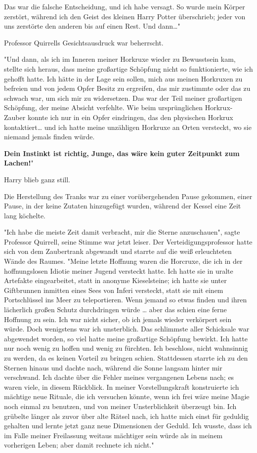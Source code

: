 {Das war die falsche Entscheidung, und ich habe versagt. So wurde mein Körper zerstört, während ich den Geist des kleinen Harry Potter überschrieb; jeder von uns zerstörte den anderen bis auf einen Rest. Und dann…"

Professor Quirrells Gesichtsausdruck war beherrscht.

"Und dann, als ich im Inneren meiner Horkruxe wieder zu Bewusstsein kam, stellte sich heraus, dass meine großartige Schöpfung nicht so funktionierte, wie ich gehofft hatte. Ich hätte in der Lage sein sollen, mich aus meinen Horkruxen zu befreien und von jedem Opfer Besitz zu ergreifen, das mir zustimmte oder das zu schwach war, um sich mir zu widersetzen. Das war der Teil meiner großartigen Schöpfung, der meine Absicht verfehlte. Wie beim ursprünglichen Horkrux-Zauber konnte ich nur in ein Opfer eindringen, das den physischen Horkrux kontaktiert… und ich hatte meine unzähligen Horkruxe an Orten versteckt, wo sie niemand jemals finden würde.

\textbf{Dein Instinkt ist richtig, Junge, das wäre kein guter Zeitpunkt zum Lachen!}"

Harry blieb ganz still.

Die Herstellung des Tranks war zu einer vorübergehenden Pause gekommen, einer Pause, in der keine Zutaten hinzugefügt wurden, während der Kessel eine Zeit lang köchelte.

"Ich habe die meiste Zeit damit verbracht, mir die Sterne anzuschauen", sagte Professor Quirrell, seine Stimme war jetzt leiser. Der Verteidigungsprofessor hatte sich von dem Zaubertrank abgewandt und starrte auf die weiß erleuchteten Wände des Raumes. "Meine letzte Hoffnung waren die Horcruxe, die ich in der hoffnungslosen Idiotie meiner Jugend versteckt hatte. Ich hatte sie in uralte Artefakte eingearbeitet, statt in anonyme Kieselsteine; ich hatte sie unter Giftbrunnen inmitten eines Sees von Inferi versteckt, statt sie mit einem Portschlüssel ins Meer zu teleportieren. Wenn jemand so etwas finden und ihren lächerlich großen Schutz durchdringen würde … aber das schien eine ferne Hoffnung zu sein. Ich war nicht sicher, ob ich jemals wieder verkörpert sein würde. Doch wenigstens war ich unsterblich. Das schlimmste aller Schicksale war abgewendet worden, so viel hatte meine großartige Schöpfung bewirkt. Ich hatte nur noch wenig zu hoffen und wenig zu fürchten. Ich beschloss, nicht wahnsinnig zu werden, da es keinen Vorteil zu bringen schien. Stattdessen starrte ich zu den Sternen hinaus und dachte nach, während die Sonne langsam hinter mir verschwand. Ich dachte über die Fehler meines vergangenen Lebens nach; es waren viele, in diesem Rückblick. In meiner Vorstellungskraft konstruierte ich mächtige neue Rituale, die ich versuchen könnte, wenn ich frei wäre meine Magie noch einmal zu benutzen, und von meiner Unsterblichkeit überzeugt bin. Ich grübelte länger als zuvor über alte Rätsel nach, ich hatte mich einst für geduldig gehalten und lernte jetzt ganz neue Dimensionen der Geduld. Ich wusste, dass ich im Falle meiner Freilassung weitaus mächtiger sein würde als in meinem vorherigen Leben; aber damit rechnete ich nicht."

}
